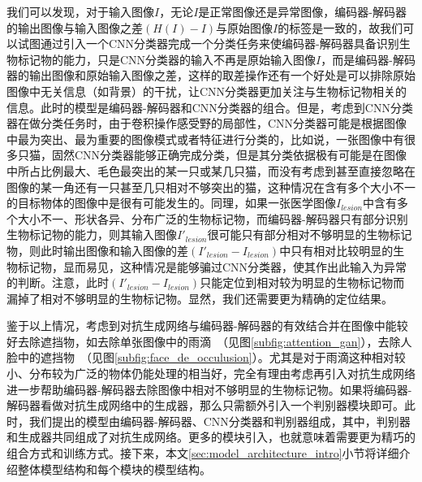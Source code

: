 我们可以发现，对于输入图像$I$，无论$I$是正常图像还是异常图像，编码器-解码器的输出图像与输入图像之差$({H}(I)-I)$与原始图像$I$的标签是一致的，故我们可以试图通过引入一个CNN分类器完成一个分类任务来使编码器-解码器具备识别生物标记物的能力，只是CNN分类器的输入不再是原始输入图像$I$，而是编码器-解码器的输出图像和原始输入图像之差，这样的取差操作还有一个好处是可以排除原始图像中无关信息（如背景）的干扰，让CNN分类器更加关注与生物标记物相关的信息。此时的模型是编码器-解码器和CNN分类器的组合。但是，考虑到CNN分类器在做分类任务时，由于卷积操作感受野的局部性，CNN分类器可能是根据图像中最为突出、最为重要的图像模式或者特征进行分类的，比如说，一张图像中有很多只猫，固然CNN分类器能够正确完成分类，但是其分类依据极有可能是在图像中所占比例最大、毛色最突出的某一只或某几只猫，而没有考虑到甚至直接忽略在图像的某一角还有一只甚至几只相对不够突出的猫，这种情况在含有多个大小不一的目标物体的图像中是很有可能发生的。同理，如果一张医学图像$I_{lesion}$中含有多个大小不一、形状各异、分布广泛的生物标记物，而编码器-解码器只有部分识别生物标记物的能力，则其输入图像$I'_{lesion}$很可能只有部分相对不够明显的生物标记物，则此时输出图像和输入图像的差$(I'_{lesion}-I_{lesion})$中只有相对比较明显的生物标记物，显而易见，这种情况是能够骗过CNN分类器，使其作出此输入为异常的判断。注意，此时$(I'_{lesion}-I_{lesion})$只能定位到相对较为明显的生物标记物而漏掉了相对不够明显的生物标记物。显然，我们还需要更为精确的定位结果。

鉴于以上情况，考虑到对抗生成网络与编码器-解码器的有效结合并在图像中能较好去除遮挡物，如去除单张图像中的雨滴~\cite{qian2018attentive}（见图\ref{subfig:attention_gan}），去除人脸中的遮挡物~\cite{yuan2019face}（见图\ref{subfig:face_de_occulusion}）。尤其是对于雨滴这种相对较小、分布较为广泛的物体仍能处理的相当好，完全有理由考虑再引入对抗生成网络进一步帮助编码器-解码器去除图像中相对不够明显的生物标记物。如果将编码器-解码器看做对抗生成网络中的生成器，那么只需额外引入一个判别器模块即可。此时，我们提出的模型由编码器-解码器、CNN分类器和判别器组成，其中，判别器和生成器共同组成了对抗生成网络。更多的模块引入，也就意味着需要更为精巧的组合方式和训练方式。接下来，本文\ref{sec:model_architecture_intro}小节将详细介绍整体模型结构和每个模块的模型结构。

